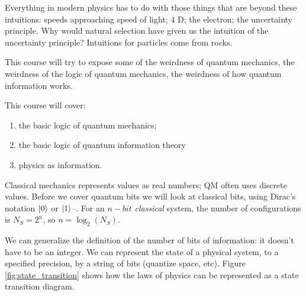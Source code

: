 \documentclass[]{article}
\begin{document}
Everything in modern physics has to do with those things that are beyond these intuitions:
speeds approaching speed of light; 4 D; the electron; the uncertainty principle. Why would natural selection have given us the intuition of the uncertainty principle? Intuitions for particles come from rocks.

This course will try to expose some of the weirdness of quantum mechanics, the weirdness of the logic of quantum mechanics, the weirdness of how quantum information works. 

This course will cover:
\begin{enumerate}
	\item the basic logic of quantum mechanics;
	\item the basic logic of quantum information theory
	\item physics as information.
\end{enumerate}

Classical mechanics represents values as real numbers; QM often uses discrete values. Before we cover quantum bits we will look at classical bits, using Dirac's notation $\ket{0}$ or $\ket{1}$--\cite{susskind2014quantum}. For an $n-bit$ \emph{classical} system, the number of configurations is $N_S=2^n$, so $n=\log_2(N_S)$.

We can generalize the definition of the number of bits of information: it doesn't have to be an integer. We can represent the state of a physical system, to a specified precision, by a string of bits (quantize space, etc). Figure \ref{fig:state_transition} shows how the laws of physics can be represented as a state transition diagram.
\end{document}
